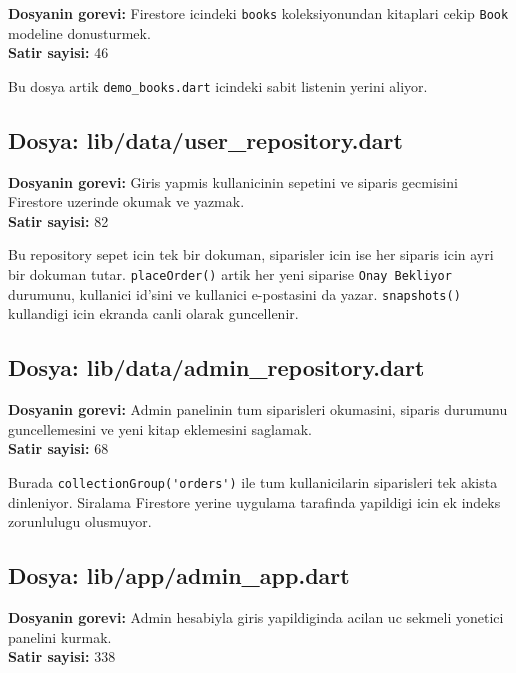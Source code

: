 \documentclass[12pt,a4paper]{article}
\begin{document}
\textbf{Dosyanin gorevi:} Firestore icindeki \verb|books| koleksiyonundan kitaplari cekip \verb|Book| modeline donusturmek.\\
\textbf{Satir sayisi:} 46



Bu dosya artik \verb|demo_books.dart| icindeki sabit listenin yerini aliyor.

\subsection{Dosya: lib/data/user\_repository.dart}

\textbf{Dosyanin gorevi:} Giris yapmis kullanicinin sepetini ve siparis gecmisini Firestore uzerinde okumak ve yazmak.\\
\textbf{Satir sayisi:} 82



Bu repository sepet icin tek bir dokuman, siparisler icin ise her siparis icin ayri bir dokuman tutar. \verb|placeOrder()| artik her yeni siparise \verb|Onay Bekliyor| durumunu, kullanici id'sini ve kullanici e-postasini da yazar. \verb|snapshots()| kullandigi icin ekranda canli olarak guncellenir.

\subsection{Dosya: lib/data/admin\_repository.dart}

\textbf{Dosyanin gorevi:} Admin panelinin tum siparisleri okumasini, siparis durumunu guncellemesini ve yeni kitap eklemesini saglamak.\\
\textbf{Satir sayisi:} 68



Burada \verb|collectionGroup('orders')| ile tum kullanicilarin siparisleri tek akista dinleniyor. Siralama Firestore yerine uygulama tarafinda yapildigi icin ek indeks zorunlulugu olusmuyor.

\subsection{Dosya: lib/app/admin\_app.dart}

\textbf{Dosyanin gorevi:} Admin hesabiyla giris yapildiginda acilan uc sekmeli yonetici panelini kurmak.\\
\textbf{Satir sayisi:} 338
\end{document}
